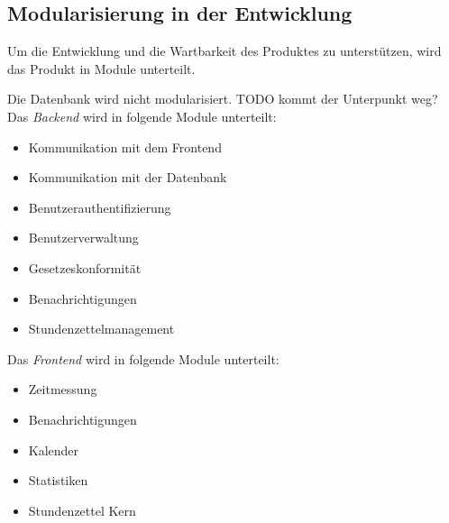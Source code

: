 \subsection{Modularisierung in der Entwicklung}

\begin{requirements}
     Um die Entwicklung und die Wartbarkeit des Produktes zu unterstützen, wird das Produkt in Module unterteilt.
    \begin{requirements}
         Die Datenbank wird nicht modularisiert. TODO kommt der Unterpunkt weg?
         Das \emph{Backend} wird in folgende Module unterteilt:
            \begin{itemize}
                \item Kommunikation mit dem Frontend
                \item Kommunikation mit der Datenbank
                \item Benutzerauthentifizierung
                \item Benutzerverwaltung
                \item Gesetzeskonformität
                \item Benachrichtigungen
                \item Stundenzettelmanagement
            \end{itemize}
         Das \emph{Frontend} wird in folgende Module unterteilt:
            \begin{itemize}
                \item Zeitmessung
                \item Benachrichtigungen
                \item Kalender
                \item Statistiken
                \item Stundenzettel Kern
            \end{itemize}
    \end{requirements}
\end{requirements}

